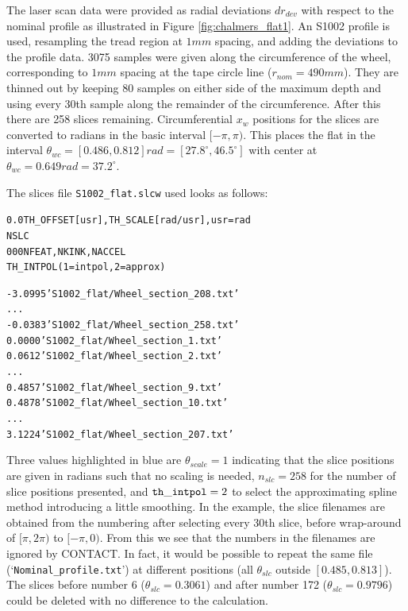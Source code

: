 \documentclass[12pt]{report}
\begin{document}
The laser scan data were provided as radial deviations $dr_{dev}$ with
respect to the nominal profile as illustrated in Figure
\ref{fig:chalmers_flat1}. An S1002 profile is used, resampling the tread
region at $1\unit{mm}$ spacing, and adding the deviations to the profile
data. 3075 samples were given along the circumference
of the wheel, corresponding to $1\unit{mm}$ spacing at the tape circle
line ($r_{nom}=490\unit{mm}$). They are thinned out by keeping 80
samples on either side of the maximum depth and using every 30th sample
along the remainder of the circumference. After this there are 258 slices
remaining. Circumferential $x_w$ positions for the slices are converted
to radians in the basic interval $[-\pi,\pi)$. This
places the flat in the interval $\theta_{wc}=[0.486,0.812]\unit{rad}=
[27.8^\circ,46.5^\circ]$ with center at $\theta_{wc}=0.649\unit{rad}=
37.2^\circ$.

The slices file {\tt S1002\_flat.slcw} used looks as follows:

\begin{alltt}\small

     0.0          TH_OFFSET [usr], TH_SCALE [rad/usr], usr=rad
                  NSLC
       0    0    0   NFEAT, NKINK, NACCEL
                    TH_INTPOL (1=intpol, 2=approx)


   -3.0995   'S1002_flat/Wheel_section_208.txt'
              ...
   -0.0383   'S1002_flat/Wheel_section_258.txt'
    0.0000   'S1002_flat/Wheel_section_1.txt'
    0.0612   'S1002_flat/Wheel_section_2.txt'
              ...
    0.4857   'S1002_flat/Wheel_section_9.txt'   %
    0.4878   'S1002_flat/Wheel_section_10.txt'
              ...
    3.1224   'S1002_flat/Wheel_section_207.txt'
\end{alltt}

Three values highlighted in blue are $\theta_{scale}=1$ indicating
that the slice positions are given in radians such that no scaling is
needed, $n_{slc}=258$ for the number of slice positions presented, and
${\tt th\_intpol}=2$ to select the approximating spline method introducing a
little smoothing. In the example, the slice filenames are obtained from the
numbering after selecting every 30th slice, before wrap-around of
$[\pi,2\pi)$ to $[-\pi,0)$. From this we see that the numbers in the
filenames are ignored by CONTACT. In fact, it would be possible to
repeat the same file (`{\tt Nominal\_profile.txt}') at different positions
(all $\theta_{slc}$ outside $[0.485,0.813]$). The slices before number 6
($\theta_{slc}=0.3061$) and after number 172 ($\theta_{slc}=0.9796$) could
be deleted with no difference to the calculation.
\end{document}
